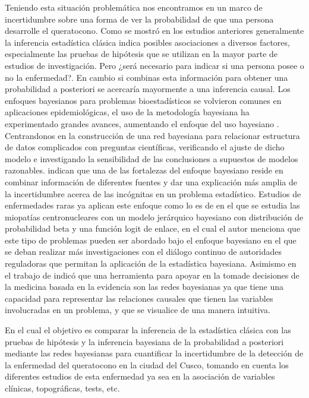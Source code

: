 Teniendo esta situación problemática nos encontramos en un marco de incertidumbre sobre una forma de ver la probabilidad de que una persona desarrolle el queratocono. Como se mostró en los estudios anteriores generalmente la inferencia estadística clásica indica posibles asociaciones a diversos factores, especialmente las pruebas de hipótesis que se utilizan en la mayor parte de estudios de investigación. Pero ¿será necesario para indicar si una persona posee o no la enfermedad?. En cambio si combinas esta información para obtener una probabilidad a posteriori se acercaría mayormente a una inferencia causal. Los enfoques bayesianos para problemas bioestadísticos se volvieron comunes en aplicaciones epidemiológicas, el uso de la metodología bayesiana ha experimentado grandes avances, aumentando el enfoque del uso bayesiano \citep{lawson2018bayesian}. Centrandonos en la construcción de una red bayesiana para relacionar estructura de datos complicados con preguntas científicas, verificando el ajuste de dicho modelo e investigando la sensibilidad de las conclusiones a supuestos de modelos razonables. \cite{Gelman_2013} indican que una de las fortalezas del enfoque bayesiano reside en combinar información de diferentes fuentes y dar una explicación más amplia de la incertidumbre acerca de las incógnitas en un problema estadístico.
Estudios de enfermedades raras ya aplican este enfoque como lo es de \cite{fouarge2021hierarchical} en el que se estudia las miopatías centronucleares con un modelo jerárquico bayesiano con distribución de probabilidad beta y una función logit de enlace, en el cual el autor menciona que este tipo de problemas pueden ser abordado bajo el enfoque bayesiano en el que se deban realizar más investigaciones con el diálogo continuo de autoridades reguladoras que permitan la aplicación de la estadística bayesiana. Asimismo en el trabajo de \cite{ferez2017redes} indicó que una herramienta para apoyar en la tomade decisiones de la medicina basada en la evidencia son las redes bayesianas ya que tiene una capacidad para representar las relaciones causales que tienen las variables involucradas en un problema, y que se visualice de una manera intuitiva.

En el cual el objetivo es comparar la inferencia de la estadística clásica con las pruebas de hipótesis y la inferencia bayesiana de la probabilidad a posteriori mediante las redes bayesianas para cuantificar la incertidumbre de la detección de la enfermedad del queratocono en la ciudad del Cusco, tomando en cuenta los diferentes estudios de esta enfermedad ya sea en la asociación de variables clínicas, topográficas, tests, etc.

